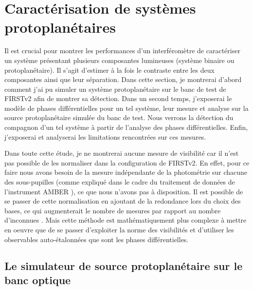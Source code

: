 \chapter{Caractérisation de systèmes protoplanétaires}
\label{sec:BinaryCharac}
\setcounter{figure}{0}
\setcounter{table}{0}
\setcounter{equation}{0}

\minitoc

\clearpage
Il est crucial pour montrer les performances d'un interféromètre de caractériser un système présentant plusieurs composantes lumineuses (système binaire ou protoplanétaire). Il s'agit d'estimer à la fois le contraste entre les deux composantes ainsi que leur séparation. Dans cette section, je montrerai d'abord comment j'ai pu simuler un système protoplanétaire sur le banc de test de \ac{FIRSTv2} afin de montrer sa détection. Dans un second temps, j'exposerai le modèle de phases différentielles pour un tel système, leur mesure et analyse sur la source protoplanétaire simulée du banc de test. Nous verrons la détection du compagnon d'un tel système à partir de l'analyse des phases différentielles. Enfin, j'exposerai et analyserai les limitations rencontrées sur ces mesures.

Dans toute cette étude, je ne montrerai aucune mesure de visibilité car il n'est pas possible de les normaliser dans la configuration de \ac{FIRSTv2}. En effet, pour ce faire nous avons besoin de la mesure indépendante de la photométrie sur chacune des sous-pupilles (comme expliqué dans le cadre du traitement de données de l'instrument \ac{AMBER} \citep{tatulli2007}), ce que nous n'avons pas à disposition. Il est possible de se passer de cette normalisation en ajoutant de la redondance lors du choix des bases, ce qui augmenterait le nombre de mesures par rapport au nombre d'inconnues \citep{lacour2007}. Mais cette méthode est mathématiquement plus complexe à mettre en oeuvre que de se passer d'exploiter la norme des visibilités et d'utiliser les observables auto-étalonnées que sont les phases différentielles.



\section{Le simulateur de source protoplanétaire sur le banc optique}
\label{sec:SystBinaire}

